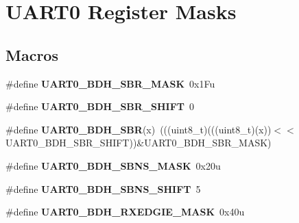 \hypertarget{group___u_a_r_t0___register___masks}{}\section{U\+A\+R\+T0 Register Masks}
\label{group___u_a_r_t0___register___masks}
\subsection*{Macros}
\begin{DoxyCompactItemize}
\item 
\mbox{\label{group___u_a_r_t0___register___masks_ga594b77e6abc9054650d85c9d7e2c4cfa}} 
\#define {\bfseries U\+A\+R\+T0\+\_\+\+B\+D\+H\+\_\+\+S\+B\+R\+\_\+\+M\+A\+SK}~0x1\+Fu
\item 
\mbox{\label{group___u_a_r_t0___register___masks_ga5262e2ab11a18782a8cceb9a63affe27}} 
\#define {\bfseries U\+A\+R\+T0\+\_\+\+B\+D\+H\+\_\+\+S\+B\+R\+\_\+\+S\+H\+I\+FT}~0
\item 
\mbox{\label{group___u_a_r_t0___register___masks_gaaab64986eac86f67040cce306b41e610}} 
\#define {\bfseries U\+A\+R\+T0\+\_\+\+B\+D\+H\+\_\+\+S\+BR}(x)~(((uint8\+\_\+t)(((uint8\+\_\+t)(x))$<$$<$U\+A\+R\+T0\+\_\+\+B\+D\+H\+\_\+\+S\+B\+R\+\_\+\+S\+H\+I\+FT))\&U\+A\+R\+T0\+\_\+\+B\+D\+H\+\_\+\+S\+B\+R\+\_\+\+M\+A\+SK)
\item 
\mbox{\label{group___u_a_r_t0___register___masks_gaed905f161d823efa3beca3e0e93d39ff}} 
\#define {\bfseries U\+A\+R\+T0\+\_\+\+B\+D\+H\+\_\+\+S\+B\+N\+S\+\_\+\+M\+A\+SK}~0x20u
\item 
\mbox{\label{group___u_a_r_t0___register___masks_gad8909b0c50ce1d7436a2bdb2d99cce1a}} 
\#define {\bfseries U\+A\+R\+T0\+\_\+\+B\+D\+H\+\_\+\+S\+B\+N\+S\+\_\+\+S\+H\+I\+FT}~5
\item 
\mbox{\label{group___u_a_r_t0___register___masks_ga345980eca350a190e8fc3e39109a0eea}} 
\#define {\bfseries U\+A\+R\+T0\+\_\+\+B\+D\+H\+\_\+\+R\+X\+E\+D\+G\+I\+E\+\_\+\+M\+A\+SK}~0x40u
\item 
$$
\end{DoxyCompactItemize}
